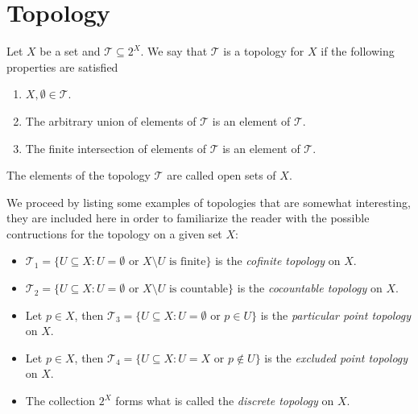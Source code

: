 \section{Topology}


\begin{definition}[Topology]\label{def:topology}
Let \(X\) be a set and \(\mathcal T \subseteq 2^X\). We say that \(\mathcal T\)
is a topology for \(X\) if the following properties are satisfied
\begin{enumerate}[(T1)]\setlength\itemsep{0em}
\item\label{item:topology-T1}
  \(X, \emptyset \in \mathcal T\).

\item\label{item:topology-T2}
  The arbitrary union of elements of \(\mathcal T\) is an element of
  \(\mathcal T\).

\item\label{item:topology-T3}
  The finite intersection of elements of \(\mathcal T\) is an element of
  \(\mathcal T\).
\end{enumerate}
The elements of the topology \(\mathcal T\) are called open sets of \(X\).
\end{definition}

\begin{example}\label{exp:some-topologies}
We proceed by listing some examples of topologies that are somewhat interesting,
they are included here in order to familiarize the reader with the possible
contructions for the topology on a given set \(X\):
\begin{itemize}\setlength\itemsep{0em}
\item \(\mathcal T_1 = \{U \subseteq X : U = \emptyset \text{ or
  } X \setminus U \text{ is finite}\}\) is the \emph{cofinite topology} on \(X\).

\item \(\mathcal T_2 = \{U \subseteq X : U = \emptyset \text{ or } X \setminus U
  \text{ is countable}\}\) is the \emph{cocountable topology} on \(X\).

\item Let \(p \in X\), then \(\mathcal T_3 = \{U \subseteq X : U = \emptyset
  \text{ or } p \in U\}\) is the \emph{particular point topology} on \(X\).

\item Let \(p \in X\), then \(\mathcal T_4 = \{U \subseteq X : U = X \text{ or }
  p \not\in U\}\) is the \emph{excluded point topology} on \(X\).
\item The collection \(2^X\) forms what is called the \emph{discrete topology}
  on \(X\).
\end{itemize}
\end{example}

